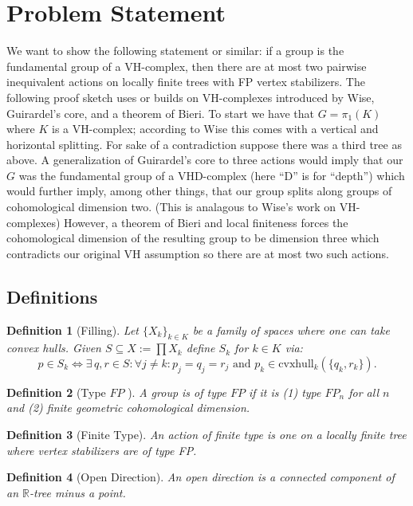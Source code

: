 \documentclass{article}
\theoremstyle{mystyle}
\newtheorem{defn}{Definition}
\theoremstyle{remark}
\begin{document}
\section{Problem Statement}


We want to show the following statement or similar: if a group is the fundamental group of a VH-complex, then there are at most two pairwise inequivalent actions on locally finite trees with FP vertex stabilizers. The following proof sketch uses or builds on VH-complexes introduced by Wise, Guirardel's core, and a theorem of Bieri. To start we have that \(G = \pi_1(K)\) where \(K\) is a VH-complex; according to Wise this comes with a vertical and horizontal splitting. For sake of a contradiction suppose there was a third tree as above. A generalization of Guirardel's core to three actions would imply that our \(G\) was the fundamental group of a VHD-complex (here ``D'' is for ``depth'') which would further imply, among other things, that our group splits along groups of cohomological dimension two. (This is analagous to Wise's work on VH-complexes) However, a theorem of Bieri and local finiteness forces the cohomological dimension of the resulting group to be dimension three which contradicts our original VH assumption so there are at most two such actions.

\subsection{Definitions}

\begin{defn}
	[Filling]
    Let \(\{X_{k}\}_{k \in K}\) be a family of spaces where one can take convex hulls. Given \(S \subseteq X := \prod X_{k}\) define \(S_{k}\) for \(k \in K\) via: \[p \in S_{k} \iff \exists \,q,r \in S: \forall j \neq k: p_{j} = q_{j} = r_{j} \text{ and } p_{k} \in \text{cvxhull}_k (\{q_{k} , r_{k}\}).\] 
\end{defn}
\begin{defn}
	[Type \(FP\) ]
	A group is of type \(FP\) if it is (1) type \(FP_n\) for all \(n\) and (2) finite geometric cohomological dimension.
\end{defn}

\begin{defn}
	[Finite Type] 
	An action of {\em finite type} is one on a locally finite tree where  vertex stabilizers are of type FP.
\end{defn}

\begin{defn}[Open Direction] An open direction is a connected component of an \(\mathbb{R}\)-tree minus a point. 
\end{defn}
\end{document}

